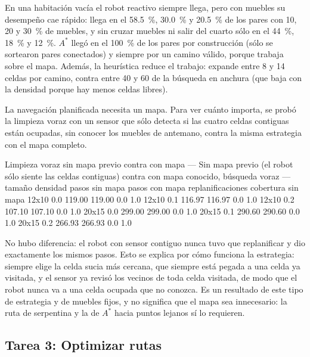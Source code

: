\documentclass[11pt,letterpaper]{article}
\begin{document}
En una habitación vacía el robot reactivo siempre llega, pero con muebles su desempeño cae rápido: llega en el 58.5~\%, 30.0~\% y 20.5~\% de los pares con 10, 20 y 30~\% de muebles, y sin cruzar muebles ni salir del cuarto sólo en el 44~\%, 18~\% y 12~\%. $A^*$ llegó en el 100~\% de los pares por construcción (sólo se sortearon pares conectados) y siempre por un camino válido, porque trabaja sobre el mapa. Además, la heurística reduce el trabajo: expande entre 8 y 14 celdas por camino, contra entre 40 y 60 de la búsqueda en anchura (que baja con la densidad porque hay menos celdas libres).

La navegación planificada necesita un mapa. Para ver cuánto importa, se probó la limpieza voraz con un sensor que sólo detecta si las cuatro celdas contiguas están ocupadas, sin conocer los muebles de antemano, contra la misma estrategia con el mapa completo.

\begin{consola}[label=out:mapa]{Limpieza voraz sin mapa previo contra con mapa}
--- Sin mapa previo (el robot sólo siente las celdas contiguas) contra con mapa conocido, búsqueda voraz ---
tamaño  densidad  pasos sin mapa  pasos con mapa  replanificaciones  cobertura sin mapa
 12x10       0.0          119.00          119.00                0.0                 1.0
 12x10       0.1          116.97          116.97                0.0                 1.0
 12x10       0.2          107.10          107.10                0.0                 1.0
 20x15       0.0          299.00          299.00                0.0                 1.0
 20x15       0.1          290.60          290.60                0.0                 1.0
 20x15       0.2          266.93          266.93                0.0                 1.0
\end{consola}

No hubo diferencia: el robot con sensor contiguo nunca tuvo que replanificar y dio exactamente los mismos pasos. Esto se explica por cómo funciona la estrategia: siempre elige la celda sucia más cercana, que siempre está pegada a una celda ya visitada, y el sensor ya revisó los vecinos de toda celda visitada, de modo que el robot nunca va a una celda ocupada que no conozca. Es un resultado de este tipo de estrategia y de muebles fijos, y no significa que el mapa sea innecesario: la ruta de serpentina y la de $A^*$ hacia puntos lejanos sí lo requieren.

\subsection{Tarea 3: Optimizar rutas}
\end{document}
